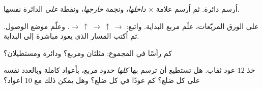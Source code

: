 \begin{exercise}[$\star$]\label{exo:g1:shapes:6}
اُرسم دائرة. ثم اُرسم علامة × \emph{داخلها}، ونجمة
\emph{خارجها}، ونقطة \emph{على} الدائرة نفسها.
\end{exercise}

\begin{exercise}[$\star$]\label{exo:g1:shapes:7}
على الورق المربّعات، علّم مربع البداية. واتبع:
$\to\ \uparrow\ \to\ \uparrow\ \to$. وعلّم موضع الوصول. ثم اُكتب
المسار الذي يعود مباشرة إلى البداية.
\end{exercise}

\begin{exercise}[$\star$]\label{exo:g1:shapes:8}
كم رأسًا في المجموع: مثلثان ومربع؟ ودائرة
ومستطيلان؟
\end{exercise}

\begin{exercise}[$\star\star$]\label{exo:g1:shapes:9}
خذ $12$ عود ثقاب. هل تستطيع أن ترسم بها \emph{كلها} حدود مربع،
بأعواد كاملة وبالعدد نفسه على كل ضلع؟ كم عودًا في كل ضلع؟ وهل يمكن
ذلك مع $10$ أعواد؟
\end{exercise}
